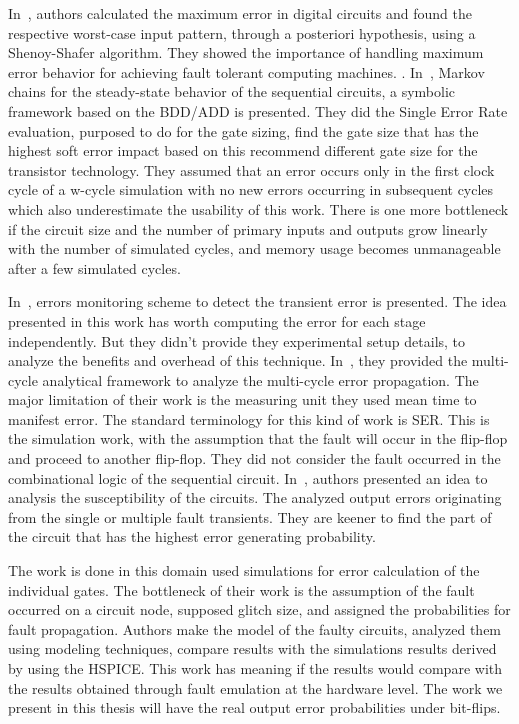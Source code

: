 In~\citep{lingasubramanian2010probabilistic}, authors calculated the maximum error in digital circuits and found the respective
worst-case input pattern, through a posteriori hypothesis, using a Shenoy-Shafer algorithm.
They showed the importance of handling maximum error behavior for achieving fault tolerant
computing machines. .
In~\citep{miskov2008modeling}, Markov chains for the steady-state behavior of the sequential circuits, a symbolic framework
based on the BDD/ADD is presented. They did the Single Error Rate evaluation, purposed to do
for the gate sizing, find the gate size that has the highest soft error impact based on this recommend
different gate size for the transistor technology. They assumed that an error occurs only in the first clock cycle of a w-cycle simulation with
no new errors occurring in subsequent cycles which also underestimate the usability of this work.  There is one more bottleneck if the circuit size and the number of primary
inputs and outputs grow linearly with the number of simulated cycles, and memory usage becomes
unmanageable after a few simulated cycles.
 

In~\citep{das2007monitoring}, errors monitoring scheme to detect the transient error is presented. The idea presented in this work has worth computing the error for each stage
independently. But they didn't provide they experimental setup details, to analyze the benefits and overhead of this technique.
In~\citep{asadi2005soft}, they provided the multi-cycle analytical framework to analyze the multi-cycle error
propagation. The major limitation of their work is the measuring unit they used  mean time
to manifest error. The standard terminology for this kind of work is SER. This is the simulation work,
with the assumption that the fault will occur in the flip-flop and proceed to another flip-flop. They did not
consider the fault occurred in the combinational logic of the sequential circuit.
In~\citep{miskov2010multiple}, authors presented an idea to analysis the susceptibility of the circuits. The analyzed output
errors originating from the single or multiple fault transients. They are keener to find the part of
the circuit that has the highest error generating probability.

The work is done in this domain used simulations for error calculation of the individual gates. The bottleneck of their work is the assumption of the fault occurred on a circuit node, supposed glitch size, and assigned the
probabilities for fault propagation.  Authors make the model of the faulty circuits, analyzed them using modeling techniques, compare results with the simulations results derived by using the
HSPICE. This work has meaning if the results would compare with the results obtained through fault emulation at the hardware level. The work we present in this thesis will have the real output error probabilities under bit-flips.



\label{related}